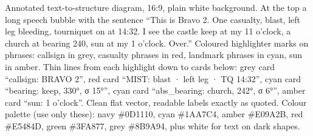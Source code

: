 {Annotated text-to-structure diagram, 16:9, plain white background. At the top a long speech bubble with the sentence
``This is Bravo 2. One casualty, blast, left leg bleeding, tourniquet on at 14:32. I see the castle keep at my
11 o'clock, a church at bearing 240, sun at my 1 o'clock. Over.'' Coloured highlighter marks on phrases: callsign
in grey, casualty phrases in red, landmark phrases in cyan, sun in amber. Thin lines from each highlight down to
cards below: grey card ``callsign: BRAVO 2'', red card ``MIST: blast · left leg · TQ 14:32'', cyan card
``bearing: keep, 330°, σ 15°'', cyan card ``abs\_bearing: church, 242°, σ 6°'', amber card ``sun: 1 o'clock''.
Clean flat vector, readable labels exactly as quoted. Colour palette (use only these): navy \#0D1110, cyan \#1AA7C4, amber \#E09A2B, red \#E5484D, green \#3FA877, grey \#8B9A94, plus white for text on dark shapes.}
